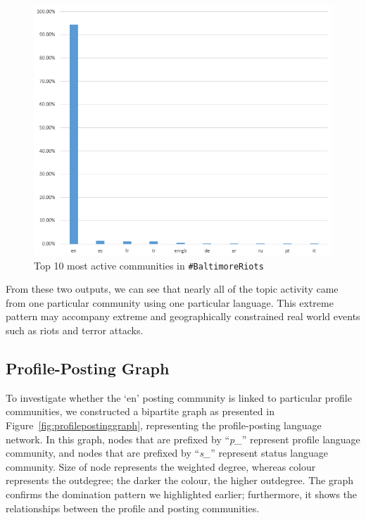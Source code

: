 \documentclass[conference]{IEEEtran}
\begin{document}
\begin{figure}[!htb]
\centering
\includegraphics[width=\columnwidth]{images/activecomm.png}
\caption{Top 10 most active communities in {\texttt{\#BaltimoreRiots}}}
\label{fig:activecomm}
\end{figure}

From these two outputs, we can see that nearly all of the topic
activity came from one particular community using one particular
language. This extreme pattern may accompany extreme and
geographically constrained real world events such as riots and terror
attacks.


\subsection{Profile-Posting Graph}

To investigate whether the `en' posting community is linked to
particular profile communities, we constructed a bipartite graph as
presented in Figure~\ref{fig:profilepostinggraph}, representing the
profile-posting language network. In this graph, nodes that are
prefixed by ``{\emph{p\_}}'' represent profile language community, and
nodes that are prefixed by ``{\emph{s\_}}'' represent status language
community. Size of node represents the weighted degree, whereas colour
represents the outdegree; the darker the colour, the higher
outdegree. The graph confirms the domination pattern we highlighted
earlier; furthermore, it shows the relationships between the profile and
posting communities. 
\end{document}
